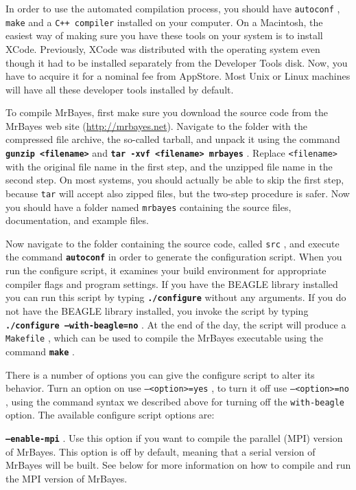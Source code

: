 \documentclass[12pt]{book}
\newcommand{\ttt}[1]{\texttt{#1} }
\newcommand{\tb}[1]{\ttt{\textbf{#1}} }
\begin{document}
In order to use the automated compilation process, you should have \ttt{autoconf}, \ttt{make} and a
\ttt{C++ compiler} installed on your computer. On a Macintosh, the easiest way of making sure you
have these tools on your system is to install XCode. Previously, XCode was distributed with the
operating system even though it had to be installed separately from the Developer Tools disk. Now,
you have to acquire it for a nominal fee from AppStore. Most Unix or Linux machines will have all
these developer tools installed by default.

To compile MrBayes, first make sure you download the source code from the MrBayes web site
(\url{http://mrbayes.net}). Navigate to the folder with the compressed file archive, the so-called
tarball, and unpack it using the command \tb{gunzip <filename>} and \tb{tar -xvf <filename>
mrbayes}. Replace \ttt{<filename>} with the original file name in the first step, and the unzipped
file name in the second step.  On most systems, you should actually be able to skip the first step,
because \ttt{tar} will accept also zipped files, but the two-step procedure is safer. Now you
should have a folder named \ttt{mrbayes} containing the source files, documentation, and example
files.

Now navigate to the folder containing the source code, called \ttt{src}, and execute the command
\tb{autoconf} in order to generate the configuration script.  When you run the configure script, it
examines your build environment for appropriate compiler flags and program settings. If you have
the BEAGLE library installed you can run this script by typing \tb{./configure} without any
arguments.  If you do not have the BEAGLE library installed, you invoke the script by typing
\tb{./configure --with-beagle=no}. At the end of the day, the script will produce a \ttt{Makefile},
which can be used to compile the MrBayes executable using the command \tb{make}.

There is a number of options you can give the configure script to alter its behavior. Turn an
option on use \ttt{--<option>=yes}, to turn it off use \ttt{--<option>=no}, using the command
syntax we described above for turning off the \ttt{with-beagle} option. The available configure
script options are:

\tb{--enable-mpi}. Use this option if you want to compile the parallel (MPI) version of MrBayes.
This option is off by default, meaning that a serial version of MrBayes will be built. See below
for more information on how to compile and run the MPI version of MrBayes.
\end{document}
